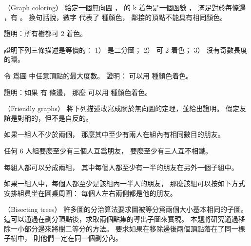 \startsubject[
  title={Problems},
]

\startPROBLEM
（Graph coloring）
給定一個無向圖 ，
  的 {\EMP k 着色}是一個函數 ，
滿足對於每條邊 ，有 。
換句話說，數字  代表了  種顏色，
鄰接的頂點不能具有相同顏色。

\startigBase[a]\startitem
證明：所有樹都可 2 着色。
\stopitem\stopigBase

\startANSWER
{}
\stopANSWER

\startigBase[continue]\startitem
證明下列三條描述是等價的：
 1）  是二分圖；
 2）  可 2 着色；
 3）  沒有奇數長度的環。
\stopitem\stopigBase

\startANSWER
{}
\stopANSWER

\startigBase[continue]\startitem
令  爲圖  中任意頂點的最大度數。
證明：  可以用  種顏色着色。
\stopitem\stopigBase

\startANSWER
{}
\stopANSWER

\startigBase[continue]\startitem
證明：如果  有  條邊，
那麼  可以用  種顏色着色。
\stopitem\stopigBase

\startANSWER
{}
\stopANSWER
\stopPROBLEM

\startPROBLEM
（Friendly graphs）
將下列描述改寫成關於無向圖的定理，並給出證明。
假定友誼是對稱的，但不是自反的。

\startigBase[a]\startitem
如果一組人不少於兩個，
那麼其中至少有兩人在組內有相同數目的朋友。
\stopitem\stopigBase

\startANSWER
{}
\stopANSWER

\startigBase[continue]\startitem
任何 6 人組要麼至少有三個人互爲朋友，
要麼至少有三人互不相識。
\stopitem\stopigBase

\startANSWER
{}
\stopANSWER

\startigBase[continue]\startitem
每組人都可以分成兩組，
其中每個人都至少有一半的朋友在另外一個子組中。
\stopitem\stopigBase

\startANSWER
{}
\stopANSWER

\startigBase[continue]\startitem
如果一組人中，每個人都至少是該組內一半人的朋友，
那麼該組可以按如下方式安排組員坐在圓桌周圍：
每個人左右兩側都是他的朋友。
\stopitem\stopigBase

\startANSWER
{}
\stopANSWER
\stopPROBLEM

\startPROBLEM
（Bisecting trees）
許多圖的分治算法要求圖被等分爲兩個大小基本相同的子圖。
這可以通過在劃分頂點後，求取兩個點集的導出子圖來實現。
本題將研究通過移除一小部分邊來將樹二等分的方法。
要求如果在移除邊後兩個頂點落在了同一棵子樹中，
則他們一定在同一個劃分內。

